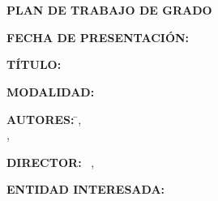 
\renewcommand{\contentsname}{\hfill\bfseries\normalsize \MakeUppercase{Tabla de Contenido}\hfill}
\renewcommand{\cftaftertoctitle}{\hfill}

\begin{titlepage}

	\begin{center}

		\textbf{\MakeUppercase{\Uni}} \\
		\textbf{\MakeUppercase{\Fac}} \\
		\textbf{\MakeUppercase{\Esc}}

		\skipline

		\textbf{PLAN DE TRABAJO DE GRADO}

		\skipline
		\skipline

	\end{center}


	\textbf{FECHA DE PRESENTACIÓN: } \CiudadFecha

	\textbf{TÍTULO: } \Tit

	\textbf{MODALIDAD: } \Mod

	\begin{tabbing}
		\textbf{AUTORES: } \= \NamA, \CodA \\
		\> \NamB, \CodB
	\end{tabbing}

	\textbf{DIRECTOR: } \TDir\ \Dir, \EDir

	\textbf{ENTIDAD INTERESADA: } \EntI

\end{titlepage}

\tableofcontents

\pagebreak
\begin{center}
	\MakeUppercase{\textbf{ \Tit}}
\end{center}
